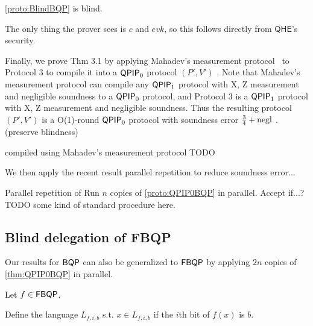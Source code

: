 \begin{thm}
	\cref{proto:BlindBQP} is blind.
\end{thm}
\begin{prf}
	The only thing the prover sees is $c$ and $evk$, so this follows directly from $\mathsf{QHE}$'s security.
\end{prf}


Finally, we prove Thm 3.1 by applying Mahadev's measurement protocol~\cite{mahadev_delegation} to Protocol 3 to compile it into a $\operatorname{\mathsf{QPIP}}_0$ protocol $(P', V')$ .
Note that Mahadev's measurement protocol can compile any $\operatorname{\mathsf{QPIP}}_1$ protocol with X, Z measurement and negligible soundness to a $\operatorname{\mathsf{QPIP}}_0$ protocol, and Protocol 3 is a $\operatorname{\mathsf{QPIP}}_1$ protocol with X, Z measurement and negligible soundness.
Thus the resulting protocol $(P', V')$ is a O(1)-round $\operatorname{\mathsf{QPIP}}_0$ protocol with soundness error $\frac{3}{4} + \operatorname{negl}$ . (preserve blindness)


\begin{protocol}{ compiled using Mahadev's measurement protocol}
	\label{proto:QPIP0BQP}
	TODO

\end{protocol}

We then apply the recent result parallel repetition to reduce soundness error...


\begin{protocol}{Parallel repetition of}
	\label{proto:repQPIP0BQP}
	Run $n$ copies of \cref{proto:QPIP0BQP} in parallel. Accept if...? TODO some kind of standard procedure here.

\end{protocol}

\subsection{Blind delegation of FBQP}


Our results for $\operatorname{\mathsf{BQP}}$ can also be generalized to $\operatorname{\mathsf{FBQP}}$ by applying $2n$ copies of \cref{thm:QPIP0BQP} in parallel.

Let $f\in\operatorname{\mathsf{FBQP}}$.

Define the language $L_{f, i, b}$ s.t. $x\in L_{f, i, b}$ if the $i$th bit of $f(x)$ is $b$.

